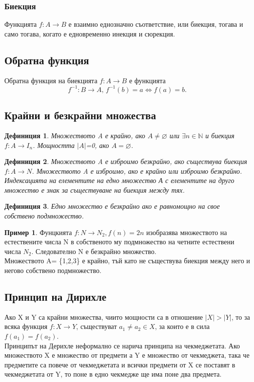 \documentclass[fleqn, 12pt]{article}
\newtheorem{definition}{Дефиниция}[subsection]
\theoremstyle{definition}
\newtheorem{example}{Пример}[subsection]
\begin{document}
\subsubsection{Биекция}
Функцията $f: A \to B$ е взаимно еднозначно съответствие, или биекция, тогава и само тогава, когато е едновременно инекция и сюрекция.

\subsection{Обратна функция}
Обратна функция на биекцията $f: A \to B$ е функцията 
$$f^{-1}:B \to A, \, f^{-1}(b) = a \Leftrightarrow f(a) = b.$$

\subsection{Крайни и безкрайни множества}

\begin{definition}
Множеството A е крайно, ако $ A \neq \varnothing $ или $\exists n \in \mathbb{N} $ и биекция $f: A \to I_n$. Мощността $\vert A \vert $=0, ако $ A = \varnothing $.
\end{definition}

\begin{definition}
Множеството A е изброимо безкрайно, ако съществува биекция $f: A \to N$. Множеството A е изброимо, ако е крайно или изброимо безкрайно. \\
Индексацията на елементите на едно множество А с елементите на друго множество е знак за съществуване на биекция между тях. 
\end{definition}

\begin{definition}
Едно множество е безкрайно ако е равномощно на свое собствено подмножество.
\end{definition}

\begin{example}
Фунцкията $f: N \to N_2, f(n) = 2n$ изобразява множеството на естествените числа N в собственото му подмножество на четните естествени числа $N_2$. Следователно 
N е безкрайно множество. \\
Множеството A= \{1,2,3\} е крайно, тъй като не съществува биекция между него и негово собствено подмножество.
\end{example}

\subsection{Принцип на Дирихле}
Ако X и Y са крайни множества, чиито мощности са в отношение $ \vert X \vert > \vert Y \vert $, то за всяка функция $f: X \to Y$, съществуват $a_1 \neq a_2 \in X$, за които е в сила $f(a_1)=f(a_2)$.\\
Принципът на Дерихле неформално се нарича принципа на чекмеджетата. Ако множеството X е множество от предмети а Y е множество от чекмеджета, така че предметите са повече от чекмеджетата и всички предмети от X се поставят в чекмеджетата от Y, то поне в едно чекмедже ще има поне два предмета.
\end{document}
